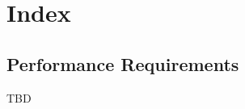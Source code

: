 \documentclass[letterpaper, 10, draftclsnofoot, onecolumn]{IEEEtran}
\begin{document}





\section{Index}

\subsection{Performance Requirements}
	TBD
\end{document}
